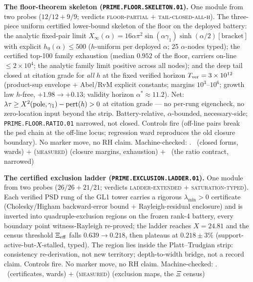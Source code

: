 \documentclass[11pt,a4paper]{article}
\theoremstyle{definition}
\begin{document}
\par\smallskip\noindent\textbf{The floor-theorem skeleton
(\texttt{PRIME.FLOOR.SKELETON.01}).}
One module from two probes ($12/12+9/9$; verdicts
\textsc{floor-partial} $+$ \textsc{tail-closed-all-h}).  The
three-piece uniform certified lower-bound skeleton of the floor
on the deployed battery: the analytic fixed-pair limit
$X_\infty(\alpha)=16\alpha\pi^2\sin(\alpha\gamma_1)
\sinh(\alpha/2)[\text{bracket}]$ with explicit $h_0(\alpha)\le
500$ ($h$-uniform per deployed $\alpha$; 25 $\alpha$-nodes
typed); the certified top-100 family exhaustion (median $0.952$
of the floor, carriers on-line $\le2\times10^4$; the analytic
family limit positive across all nodes); and the deep tail
closed at citation grade for \emph{all} $h$ at the fixed
verified horizon $T_{\rm ver}=3\times10^{12}$ (product-sup
envelope $+$ Abel/RvM explicit constants; margins
$10^3$--$10^6$; growth law $h$-free, $+1.98\to+0.13$; validity
horizon $\alpha^*\approx11.2$).  Net: $\lambda\tau\ge X^2({\rm
pole},\gamma_1)-{\rm pert}(h)>0$ at citation grade --- no
per-rung eigencheck, no zero-location input beyond the strip.
Battery-relative, $\alpha$-bounded, necessary-side;
\texttt{PRIME.FLOOR.RATIO.01} narrowed, not closed.  Controls
fire (off-line pairs break the psd chain at the off-line locus;
regression ward reproduces the old closure boundary).  No marker
move, no RH claim.
Machine-checked: .
\mE\ (closed forms, wards) $+$ (\textsc{measured}) (closure
margins, exhaustion) $+$ \mO\ (the ratio contract, narrowed)
\par\smallskip

\par\smallskip\noindent\textbf{The certified exclusion ladder
(\texttt{PRIME.EXCLUSION.LADDER.01}).}
One module from two probes ($26/26 + 21/21$; verdicts
\textsc{ladder-extended} $+$ \textsc{saturation-typed}).  Each
verified PSD rung of the GL1 tower carries a rigorous
$\lambda_{\min} > 0$ certificate (Cholesky/Higham backward-error
bound $+$ Rayleigh-residual enclosure) and is inverted into
quadruple-exclusion regions on the frozen rank-4 battery, every
boundary point witness-Rayleigh re-proved; the ladder reaches
$X = 24.81$ and the census threshold $\Xi_{\rm eff}$ falls
$0.639 \to 0.218$, then plateaus at $0.218 \pm 3\%$
(support-active-but-$X$-stalled, typed).  The region lies inside
the Platt--Trudgian strip: consistency re-derivation, not new
territory; depth-to-width bridge, not a record claim.  Controls
fire.  No marker move, no RH claim.
Machine-checked: .
\mE\ (certificates, wards) $+$ (\textsc{measured}) (exclusion
maps, the $\Xi$ census)
\par\smallskip
\end{document}
